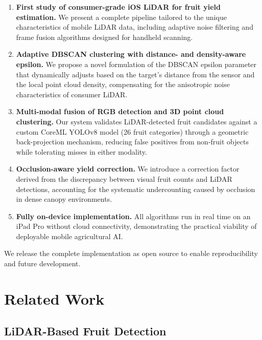 \documentclass[12pt,a4paper]{article}
\begin{document}
\begin{enumerate}
  \item \textbf{First study of consumer-grade iOS LiDAR for fruit yield estimation.} We present a complete pipeline tailored to the unique characteristics of mobile LiDAR data, including adaptive noise filtering and frame fusion algorithms designed for handheld scanning.

  \item \textbf{Adaptive DBSCAN clustering with distance- and density-aware epsilon.} We propose a novel formulation of the DBSCAN epsilon parameter that dynamically adjusts based on the target's distance from the sensor and the local point cloud density, compensating for the anisotropic noise characteristics of consumer LiDAR.

  \item \textbf{Multi-modal fusion of RGB detection and 3D point cloud clustering.} Our system validates LiDAR-detected fruit candidates against a custom CoreML YOLOv8 model (26 fruit categories) through a geometric back-projection mechanism, reducing false positives from non-fruit objects while tolerating misses in either modality.

  \item \textbf{Occlusion-aware yield correction.} We introduce a correction factor derived from the discrepancy between visual fruit counts and LiDAR detections, accounting for the systematic undercounting caused by occlusion in dense canopy environments.

  \item \textbf{Fully on-device implementation.} All algorithms run in real time on an iPad Pro without cloud connectivity, demonstrating the practical viability of deployable mobile agricultural AI.
\end{enumerate}

We release the complete implementation as open source to enable reproducibility and future development.

\section{Related Work}

\subsection{LiDAR-Based Fruit Detection}
\end{document}
